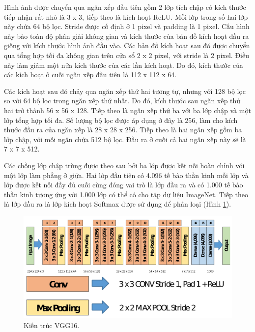 Hình ảnh được chuyển qua ngăn xếp đầu tiên gồm 2 lớp tích chập có kích thước tiếp nhận rất nhỏ là 3 x 3, tiếp theo là kích hoạt ReLU. Mỗi lớp trong số hai lớp này chứa 64 bộ lọc. Stride được cố định ở 1 pixel và padding là 1 pixel. Cấu hình này bảo toàn độ phân giải không gian và kích thước của bản đồ kích hoạt đầu ra giống với kích thước hình ảnh đầu vào. Các bản đồ kích hoạt sau đó được chuyển qua tổng hợp tối đa không gian trên cửa sổ 2 x 2 pixel, với stride là 2 pixel. Điều này làm giảm một nửa kích thước của các lần kích hoạt. Do đó, kích thước của các kích hoạt ở cuối ngăn xếp đầu tiên là 112 x 112 x 64.

Các kích hoạt sau đó chảy qua ngăn xếp thứ hai tương tự, nhưng với 128 bộ lọc so với 64 bộ lọc trong ngăn xếp thứ nhất. Do đó, kích thước sau ngăn xếp thứ hai trở thành 56 x 56 x 128. Tiếp theo là ngăn xếp thứ ba với ba lớp chập và một lớp tổng hợp tối đa. Số lượng bộ lọc được áp dụng ở đây là 256, làm cho kích thước đầu ra của ngăn xếp là 28 x 28 x 256. Tiếp theo là hai ngăn xếp gồm ba lớp chập, với mỗi ngăn chứa 512 bộ lọc. Đầu ra ở cuối cả hai ngăn xếp này sẽ là 7 x 7 x 512.

Các chồng lớp chập trùng được theo sau bởi ba lớp được kết nối hoàn chỉnh với một lớp làm phẳng ở giữa. Hai lớp đầu tiên có 4.096 tế bào thần kinh mỗi lớp và lớp được kết nối đầy đủ cuối cùng đóng vai trò là lớp đầu ra và có 1.000 tế bào thần kinh tương ứng với 1.000 lớp có thể có cho tập dữ liệu ImageNet. Tiếp theo là lớp đầu ra là lớp kích hoạt Softmax được sử dụng để phân loại (Hình \ref{fig:vgg16_imagenet_detail}).

\begin{figure}[H]
	\centering
	\includegraphics[width=1\linewidth]{images/vgg16_imagenet_detail}
	\caption{Kiến trúc VGG16.}
	\label{fig:vgg16_imagenet_detail}
\end{figure}


